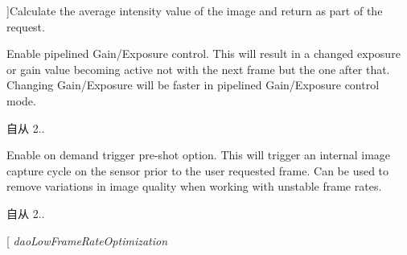 \begin{Desc}
\begin{description}
{}]Calculate the average intensity value of the image and return as part of the request. \item[{\em 
\hypertarget{group___device_specific_interface_ggad8cdd91ea42682e1055b0fb168f2ea58adc54a7e1840996eb23af122780484d15}{dao\+Pipelined\+Gain\+Expose\+Control}\label{group___device_specific_interface_ggad8cdd91ea42682e1055b0fb168f2ea58adc54a7e1840996eb23af122780484d15}
}]Enable pipelined Gain/\+Exposure control. This will result in a changed exposure or gain value becoming active not with the next frame but the one after that. Changing Gain/\+Exposure will be faster in pipelined Gain/\+Exposure control mode. \begin{DoxySince}{自从}
2.. 
\end{DoxySince}
\item[{\em 
\hypertarget{group___device_specific_interface_ggad8cdd91ea42682e1055b0fb168f2ea58a8e2474c8cd7a8015d14b8487f0550daa}{dao\+On\+Demand\+Trigger\+Pre\+Shot}\label{group___device_specific_interface_ggad8cdd91ea42682e1055b0fb168f2ea58a8e2474c8cd7a8015d14b8487f0550daa}
}]Enable on demand trigger pre-\/shot option. This will trigger an internal image capture cycle on the sensor prior to the user requested frame. Can be used to remove variations in image quality when working with unstable frame rates. \begin{DoxySince}{自从}
2.. 
\end{DoxySince}
\item[{\em 
\hypertarget{group___device_specific_interface_ggad8cdd91ea42682e1055b0fb168f2ea58a5761cf2d2824c3413e13e5de485d62be}{dao\+Low\+Frame\+Rate\+Optimization}\label{group___device_specific_interface_ggad8cdd91ea42682e1055b0fb168f2ea58a5761cf2d2824c3413e13e5de485d62be}
}
\end{description}
\end{Desc}
